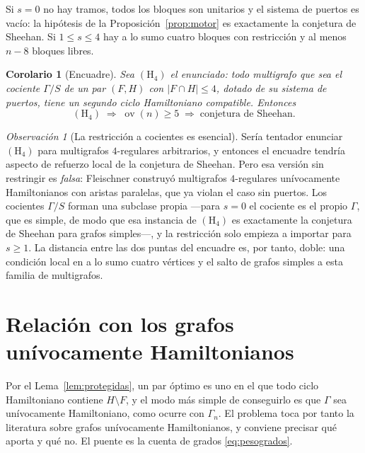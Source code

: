 \documentclass[11pt,a4paper]{article}
\newtheorem{corolario}[teorema]{Corolario}
\theoremstyle{definition}
\theoremstyle{remark}
\newtheorem{observacion}[teorema]{Observación}
\newcommand{\ov}{\operatorname{ov}}
\begin{document}
Si $s=0$ no hay tramos, todos los bloques son unitarios y el sistema de puertos es vacío: la hipótesis de la Proposición~\ref{prop:motor} es exactamente la conjetura de Sheehan. Si $1\le s\le4$ hay a lo sumo cuatro bloques con restricción y al menos $n-8$ bloques libres.

\begin{corolario}[Encuadre]\label{cor:encuadre}
Sea $(\mathrm{H}_4)$ el enunciado: \emph{todo multigrafo que sea el cociente $\Gamma/S$ de un par $(F,H)$ con $|F\cap H|\le4$, dotado de su sistema de puertos, tiene un segundo ciclo Hamiltoniano compatible.} Entonces
\[
(\mathrm{H}_4)\;\Longrightarrow\;\ov(n)\ge5\;\Longrightarrow\;\text{conjetura de Sheehan}.
\]
\end{corolario}

\begin{observacion}[La restricción a cocientes es esencial]\label{obs:salvedad}
Sería tentador enunciar $(\mathrm{H}_4)$ para multigrafos $4$-regulares arbitrarios, y entonces el encuadre tendría aspecto de refuerzo local de la conjetura de Sheehan. Pero esa versión sin restringir es \emph{falsa}: Fleischner \cite{fleischner94} construyó multigrafos $4$-regulares unívocamente Hamiltonianos con aristas paralelas, que ya violan el caso sin puertos. Los cocientes $\Gamma/S$ forman una subclase propia —para $s=0$ el cociente es el propio $\Gamma$, que es simple, de modo que esa instancia de $(\mathrm{H}_4)$ es exactamente la conjetura de Sheehan para grafos simples—, y la restricción solo empieza a importar para $s\ge1$. La distancia entre las dos puntas del encuadre es, por tanto, doble: una condición local en a lo sumo cuatro vértices y el salto de grafos simples a esta familia de multigrafos.
\end{observacion}

\section{Relación con los grafos unívocamente Hamiltonianos}\label{sec:uh}

Por el Lema~\ref{lem:protegidas}, un par óptimo es uno en el que todo ciclo Hamiltoniano contiene $H\setminus F$, y el modo más simple de conseguirlo es que $\Gamma$ sea unívocamente Hamiltoniano, como ocurre con $\Gamma_n$. El problema toca por tanto la literatura sobre grafos unívocamente Hamiltonianos, y conviene precisar qué aporta y qué no. El puente es la cuenta de grados \eqref{eq:pesogrados}.
\end{document}
